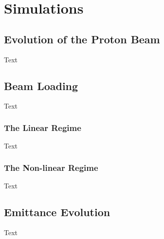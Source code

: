 %
%

\chapter{Simulations}
\label{Ch:Sim}

\section{Evolution of the Proton Beam}
\label{Sim:PBeam}

Text

\section{Beam Loading}
\label{Sim:BLoad}

Text

\subsection{The Linear Regime}
\label{Sim:Linear}

Text

\subsection{The Non-linear Regime}
\label{Sim:NLinear}

Text

\section{Emittance Evolution}
\label{Sim:Emitt}

Text

